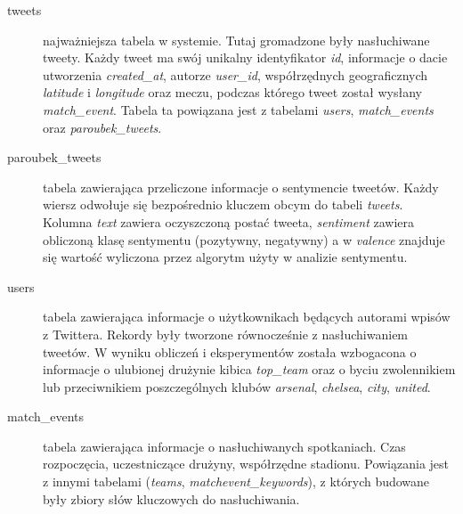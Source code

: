 \begin{description}
  \item[tweets] najważniejsza tabela w systemie. Tutaj gromadzone były
  nasłuchiwane tweety. Każdy tweet ma swój unikalny identyfikator \textit{id},
  informacje o dacie utworzenia \textit{created\_at}, autorze \textit{user\_id},
  współrzędnych geograficznych \textit{latitude} i \textit{longitude} oraz
  meczu, podczas którego tweet został wysłany \textit{match\_event}. Tabela ta
  powiązana jest z tabelami \textit{users}, \textit{match\_events} oraz
  \textit{paroubek\_tweets}.

  \item[paroubek\_tweets] tabela zawierająca przeliczone informacje o
  sentymencie tweetów. Każdy wiersz odwołuje się bezpośrednio kluczem obcym do
  tabeli \textit{tweets}. Kolumna \textit{text} zawiera oczyszczoną postać
  tweeta, \textit{sentiment} zawiera obliczoną klasę sentymentu (pozytywny,
  negatywny) a w \textit{valence} znajduje się wartość wyliczona przez algorytm
  użyty w analizie sentymentu.
 
  \item[users] tabela zawierająca informacje o użytkownikach będących autorami
  wpisów z Twittera. Rekordy były tworzone równocześnie z nasłuchiwaniem tweetów.
  W wyniku obliczeń i eksperymentów została wzbogacona o informacje o ulubionej
  drużynie kibica \textit{top\_team} oraz o byciu zwolennikiem lub przeciwnikiem
  poszczególnych klubów \textit{arsenal}, \textit{chelsea}, \textit{city},
  \textit{united}.
  
  \item[match\_events] tabela zawierająca informacje o nasłuchiwanych
  spotkaniach. Czas rozpoczęcia, uczestniczące drużyny, współrzędne stadionu.
  Powiązania jest z innymi tabelami (\textit{teams},
  \textit{matchevent\_keywords}), z których budowane były zbiory słów kluczowych
  do nasłuchiwania.
\end{description}